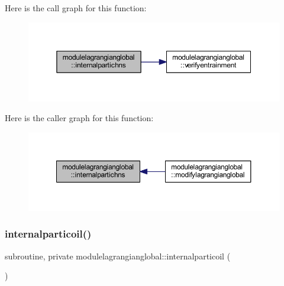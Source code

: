 Here is the call graph for this function\+:\nopagebreak
\begin{figure}[H]
\begin{center}
\leavevmode
\includegraphics[width=350pt]{namespacemodulelagrangianglobal_a0d3f22e59bfbc417e9432a9f18a9027d_cgraph}
\end{center}
\end{figure}
Here is the caller graph for this function\+:\nopagebreak
\begin{figure}[H]
\begin{center}
\leavevmode
\includegraphics[width=350pt]{namespacemodulelagrangianglobal_a0d3f22e59bfbc417e9432a9f18a9027d_icgraph}
\end{center}
\end{figure}
\mbox{\label{namespacemodulelagrangianglobal_aaea914ea480f8d07a53b58420bf6b67e}} 
\subsubsection{\texorpdfstring{internalparticoil()}{internalparticoil()}}
{\footnotesize\ttfamily subroutine, private modulelagrangianglobal\+::internalparticoil (\begin{DoxyParamCaption}{ }\end{DoxyParamCaption})\hspace{0.3cm}{\ttfamily [private]}}


